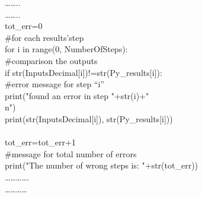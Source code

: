 ……..\\
……..\\
tot\_err=0\\
\#for each results’step\\
for i in range(0, NumberOfSteps):\\
\#comparison the outputs\\
if str(InputsDecimal[i])!=str(Py\_results[i]):\\
\#error message for step “i”    \\
print("found an error in step "+str(i)+"\\n")\\
print(str(InputsDecimal[i]), str(Py\_results[i]))\\
\\
tot\_err=tot\_err+1\\
\#message for total number of errors\\
print("The number of wrong steps is: "+str(tot\_err))\\
………….\\
…………\\
\\
\\
